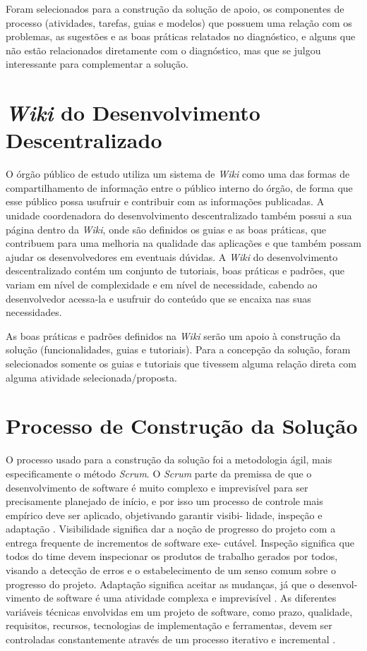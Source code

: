 Foram selecionados para a construção da solução de apoio, os componentes de processo (atividades, tarefas, guias e modelos) que possuem uma relação com os problemas, as sugestões e as boas práticas relatados no diagnóstico, e alguns que não estão relacionados diretamente com o diagnóstico, mas que se julgou interessante para complementar a solução.

\section{\textit{Wiki} do Desenvolvimento Descentralizado}

O órgão público de estudo utiliza um sistema de \textit{Wiki} como uma das formas de compartilhamento de informação entre o público interno do órgão, de forma que esse público possa usufruir e contribuir com as informações publicadas. A unidade coordenadora do desenvolvimento descentralizado também possui a sua página dentro da \textit{Wiki}, onde são definidos os guias e as boas práticas, que contribuem para uma melhoria na qualidade das aplicações e que também possam ajudar os desenvolvedores em eventuais dúvidas. A \textit{Wiki} do desenvolvimento descentralizado contém um conjunto de tutoriais, boas práticas e padrões, que variam em nível de complexidade e em nível de necessidade, cabendo ao desenvolvedor acessa-la e usufruir do conteúdo que se encaixa nas suas necessidades.

As boas práticas e padrões definidos na \textit{Wiki} serão um apoio à construção da solução (funcionalidades, guias e tutoriais). Para a concepção da solução, foram selecionados somente os guias e tutoriais que tivessem alguma relação direta com alguma atividade selecionada/proposta.

\section{Processo de Construção da Solução}

O processo usado para a construção da solução foi a metodologia ágil, mais especificamente o método \textit{Scrum}. O \textit{Scrum} parte da premissa de que o desenvolvimento de
software é muito complexo e imprevisível para ser precisamente planejado de início, e por
isso um processo de controle mais empírico deve ser aplicado, objetivando garantir visibi-
lidade, inspeção e adaptação \cite{scrum2005}. Visibilidade significa dar
a noção de progresso do projeto com a entrega frequente de incrementos de software exe-
cutável. Inspeção significa que todos do time devem inspecionar os produtos de trabalho
gerados por todos, visando a detecção de erros e o estabelecimento de um senso comum
sobre o progresso do projeto. Adaptação significa aceitar as mudanças, já que o desenvol-
vimento de software é uma atividade complexa e imprevisível \cite{agile2014}. As diferentes variáveis técnicas envolvidas em um projeto de software, como prazo,
qualidade, requisitos, recursos, tecnologias de implementação e ferramentas, devem ser
controladas constantemente através de um processo iterativo e incremental \cite{scrum2005}. 

